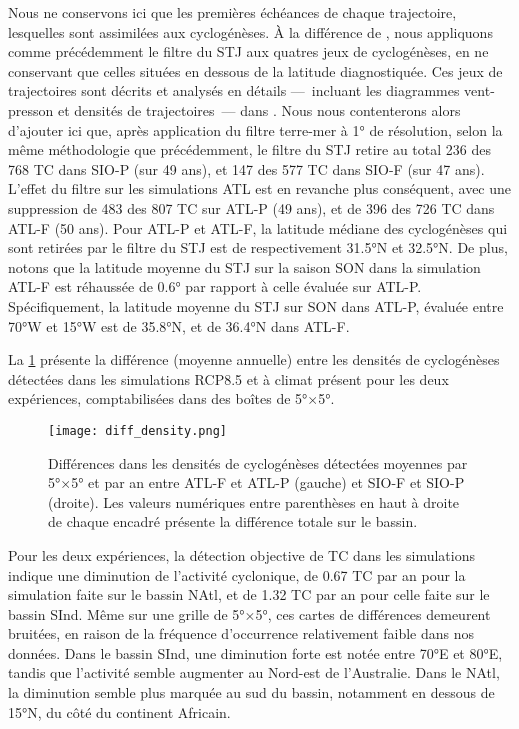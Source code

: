 \documentclass[../main.tex]{subfiles}
\begin{document}
Nous ne conservons ici que les premières échéances de chaque trajectoire, lesquelles sont assimilées aux cyclogénèses. À la différence de
\textcite{cattiaux_projected_2020,chauvin_future_2020}, nous appliquons comme précédemment le filtre du STJ aux quatres jeux de cyclogénèses, en ne conservant
que celles situées en dessous de la latitude diagnostiquée. Ces jeux de trajectoires sont décrits et analysés en détails ---~incluant les diagrammes
vent-presson et densités de trajectoires~--- dans \textcite{cattiaux_projected_2020,chauvin_future_2020}. Nous nous contenterons alors d'ajouter ici que, après
application du filtre terre-mer à \ang{1} de résolution, selon la même méthodologie que précédemment, le filtre du STJ retire au total \num{236} des \num{768}
TC dans SIO-P (sur 49 ans), et \num{147} des \num{577} TC dans SIO-F (sur 47 ans). L'effet du filtre sur les simulations ATL est en revanche plus conséquent,
avec une suppression de \num{483} des \num{807} TC sur ATL-P (49 ans), et de \num{396} des \num{726} TC dans ATL-F (50 ans). Pour ATL-P et ATL-F, la latitude
médiane des cyclogénèses qui sont retirées par le filtre du STJ est de respectivement \ang{31.5}N et \ang{32.5}N. De plus, notons que la latitude moyenne du STJ
sur la saison SON dans la simulation ATL-F est réhaussée de \ang{0.6} par rapport à celle évaluée sur ATL-P. Spécifiquement, la latitude moyenne du STJ sur SON
dans ATL-P, évaluée entre \ang{70}W et \ang{15}W est de \ang{35.8}N, et de \ang{36.4}N dans ATL-F.

La \cref{fig:diff_track} présente la différence (moyenne annuelle) entre les densités de cyclogénèses détectées dans les simulations RCP8.5 et à climat présent
pour les deux expériences, comptabilisées dans des boîtes de \ang{5}$\times$\ang{5}.

\begin{figure}[htpb]
    \centering
    \texttt{[image: diff\_density.png]}
    \caption{Différences dans les densités de cyclogénèses détectées moyennes par \ang{5}$\times$\ang{5} et par an entre ATL-F et ATL-P (gauche) et SIO-F et
    SIO-P (droite). Les valeurs numériques entre parenthèses en haut à droite de chaque encadré présente la différence totale sur le bassin.}
    \label{fig:diff_track}
\end{figure}

Pour les deux expériences, la détection objective de TC dans les simulations indique une diminution de l'activité cyclonique, de \num{0.67} TC par an pour la
simulation faite sur le bassin NAtl, et de \num{1.32} TC par an pour celle faite sur le bassin SInd. Même sur une grille de \ang{5}$\times$\ang{5}, ces cartes
de différences demeurent bruitées, en raison de la fréquence d'occurrence relativement faible dans nos données. Dans le bassin SInd, une diminution forte est
notée entre \ang{70}E et \ang{80}E, tandis que l'activité semble augmenter au Nord-est de l'Australie. Dans le NAtl, la diminution semble plus marquée au sud du
bassin, notamment en dessous de \ang{15}N, du côté du continent Africain.
\end{document}
